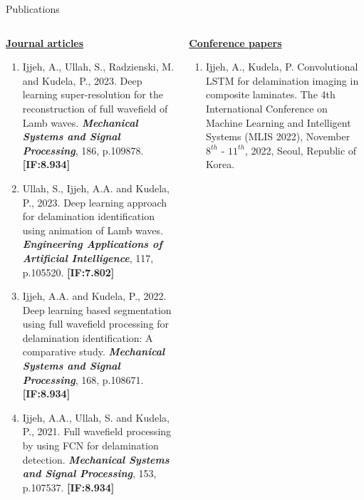\documentclass[10pt,aspectratio=169,dvipsnames]{beamer} %
\begin{document}
	\begin{frame}{Publications}
		\vspace{5pt}
		\addtolength{\leftmargini}{\labelsep}
		\begin{tiny}					
			\begin{columns}[T]
				\begin{column}[t]{0.48\textwidth}
					\underline{\textbf{Journal articles}}
					\begin{enumerate}
						\justifying
						\item Ijjeh, A., Ullah, S., Radzienski, M. and Kudela, P., 2023. Deep learning super-resolution for the reconstruction of full wavefield of Lamb waves. \textbf{\textit{Mechanical Systems and Signal Processing}}, 186, p.109878.						
						\textbf{[IF:8.934]}
						\item Ullah, S., Ijjeh, A.A. and Kudela, P., 2023. Deep learning approach for delamination identification using animation of Lamb waves. 						
						\textbf{\textit{Engineering Applications of Artificial Intelligence}}, 117, p.105520.		
						\textbf{[IF:7.802]}
						\item Ijjeh, A.A. and Kudela, P., 2022. Deep learning based segmentation using full wavefield processing for delamination identification: A comparative study. \textbf{\textit{Mechanical Systems and Signal Processing}}, 168, p.108671. \textbf{[IF:8.934]}
						\item Ijjeh, A.A., Ullah, S. and Kudela, P., 2021. Full wavefield processing by using FCN for delamination detection. \textbf{\textit{Mechanical Systems and Signal Processing}}, 153, p.107537.		
						\textbf{[IF:8.934]}	
					\end{enumerate}					
				\end{column}
				\begin{column}[t]{0.48\textwidth}
					\underline{\textbf{Conference papers}}
					\begin{enumerate}
						\justifying
						\item {Ijjeh, A.}, Kudela, P. Convolutional LSTM for delamination imaging in composite laminates. 
						The 4th International Conference on Machine Learning and Intelligent Systems (MLIS 2022), November \(8^{th}\) - \(11^{th}\), 2022, Seoul, Republic of Korea.

\end{enumerate}
\end{column}
\end{columns}
\end{tiny}
\end{frame}
\end{document}
